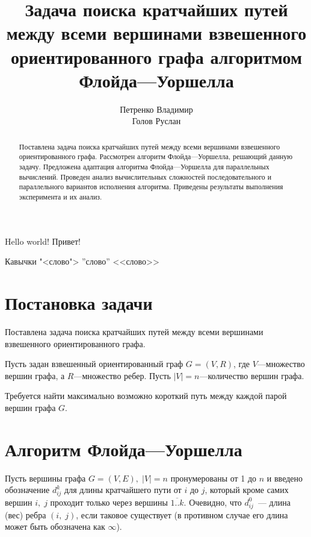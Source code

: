 \documentclass{article}
\begin{document}
	
\title{Задача поиска кратчайших путей между всеми вершинами взвешенного ориентированного графа алгоритмом Флойда---Уоршелла}
\author{Петренко Владимир\\Голов Руслан}


\begin{titlepage}
	\maketitle
	\begin{abstract}
		Поставлена задача поиска кратчайших путей между всеми вершинами взвешенного ориентированного графа. Рассмотрен алгоритм Флойда---Уоршелла, решающий данную задачу. Предложена адаптация алгоритма Флойда---Уоршелла для параллельных вычислений. Проведен анализ вычислительных сложностей последовательного и параллельного вариантов исполнения алгоритма. Приведены результаты выполнения эксперимента и их анализ.
	\end{abstract}
\end{titlepage}

Hello world!  Привет!

Кавычки "<слово"> ''слово'' <<слово>>

\section{Постановка задачи}

	Поставлена задача поиска кратчайших путей между всеми вершинами взвешенного ориентированного графа.
	
	Пусть задан взвешенный ориентированный граф \(G=(V,R)\), где \(V\)---множество вершин графа, а \(R\)---множество ребер. Пусть \(|V|=n\)---количество вершин графа.
	
	Требуется найти максимально возможно короткий путь между каждой парой вершин графа \(G\).

\section{Алгоритм Флойда---Уоршелла}

	Пусть вершины графа \(G=(V, E),\; |V| = n\) пронумерованы от 1 до \(n\) и введено обозначение \(d_{i j}^{k}\) для длины кратчайшего пути от \(i\) до \(j\), который кроме самих вершин \(i,\; j\) проходит только через вершины \(\overline{1..k}\). Очевидно, что \(d_{i j}^{0}\) — длина (вес) ребра \((i,\;j)\), если таковое существует (в противном случае его длина может быть обозначена как \(\infty\)).
	
\end{document}
